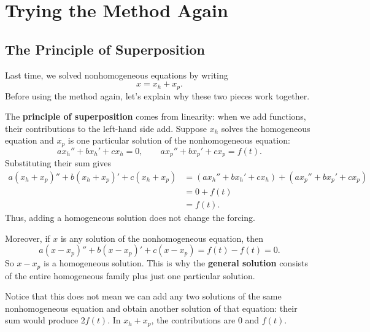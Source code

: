 \documentclass[10pt,letterpaper]{article}
\begin{document}
\renewcommand{\lessontitle}{Undetermined Coefficients, Part 2}

\section{Trying the Method Again}

\subsection{The Principle of Superposition}
Last time, we solved nonhomogeneous equations by writing
\[
\boxed{x=x_h+x_p.}
\]
Before using the method again, let's explain why these two pieces work together.

The \textbf{principle of superposition} comes from linearity:
when we add functions, their contributions to the left-hand side add.
Suppose $x_h$ solves the homogeneous equation and $x_p$ is one
particular solution of the nonhomogeneous equation:
\[
ax_h''+bx_h'+cx_h=0,
\qquad
ax_p''+bx_p'+cx_p=f(t).
\]
Substituting their sum gives
\begin{align*}
a(x_h+x_p)''+b(x_h+x_p)'+c(x_h+x_p)
&=(ax_h''+bx_h'+cx_h)+(ax_p''+bx_p'+cx_p)\\
&=0+f(t)\\
&=f(t).
\end{align*}
Thus, adding a homogeneous solution does not change the forcing.

Moreover, if $x$ is any solution of the nonhomogeneous equation, then
\[
a(x-x_p)''+b(x-x_p)'+c(x-x_p)=f(t)-f(t)=0.
\]
So $x-x_p$ is a homogeneous solution. This is why the
\textbf{general solution} consists of the entire homogeneous family
plus just one particular solution.

Notice that this does not mean we can add any two solutions of the
same nonhomogeneous equation and obtain another solution of that equation:
their sum would produce $2f(t)$. In $x_h+x_p$, the contributions are
$0$ and $f(t)$.

\end{document}

